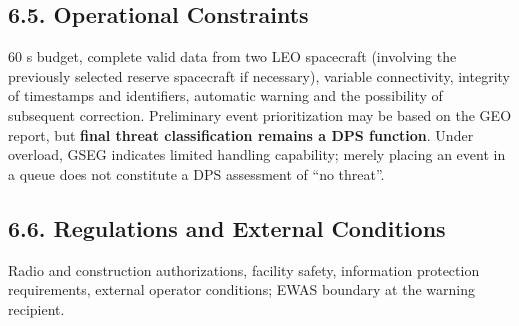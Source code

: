 \subsection{6.5. Operational Constraints}\label{operational-constraints}

60 s budget, complete valid data from two LEO spacecraft (involving the previously selected reserve spacecraft if necessary), variable connectivity, integrity of timestamps and identifiers, automatic warning and the possibility of subsequent correction. Preliminary event prioritization may be based on the GEO report, but \textbf{final threat classification remains a DPS function}. Under overload, GSEG indicates limited handling capability; merely placing an event in a queue does not constitute a DPS assessment of “no threat”.

\subsection{6.6. Regulations and External Conditions}\label{regulatory-and-external-conditions}

Radio and construction authorizations, facility safety, information protection requirements, external operator conditions; EWAS boundary at the warning recipient.

